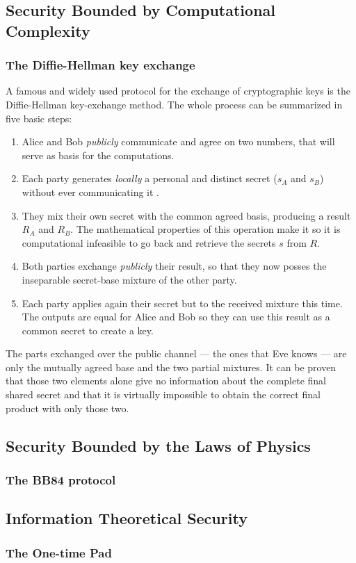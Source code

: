 	\subsection{Security Bounded by Computational Complexity}

		\subsubsection{The Diffie-Hellman key exchange}
	
		A famous and widely used protocol for the exchange of cryptographic keys is the Diffie-Hellman key-exchange method.\cite{DH76}
	The whole process can be summarized in five basic steps:
	\begin{enumerate}
		\item Alice and Bob \emph{publicly} communicate and agree on two numbers, that will serve as basis for the computations.
		\item Each party generates \emph{locally} a personal and distinct secret ($s_A$ and $s_B$) without ever communicating it .
		\item They mix their own secret with the common agreed basis, producing a result $R_A$ and $R_B$. The mathematical properties of this operation make it so it is computational infeasible to go back and retrieve the secrets $s$ from $R$.
		\item Both parties exchange \emph{publicly} their result, so that they now posses the inseparable secret-base mixture of the other party.
		\item Each party applies again their secret but to the received mixture this time. The outputs are equal for Alice and Bob so they can use this result as a common secret to create a key.
	\end{enumerate}	 
	The parts exchanged over the public channel --- the ones that Eve knows --- are only the mutually agreed base and the two partial mixtures. 
	It can be proven that those two elements alone give no information about the complete final shared secret and that it is virtually impossible to obtain the correct final product with only those two.\\  
		
	\subsection{Security Bounded by the Laws of Physics}
	
		\subsubsection{The BB84 protocol}
	
	\subsection{Information Theoretical Security}
	
		\subsubsection{The One-time Pad}
